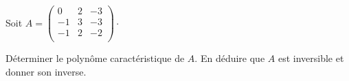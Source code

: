 \documentclass[a4paper,10pt]{report}
\begin{document}
\begin{exa} Soit $A = \begin{pmatrix}
0& 2 & -3 \\
-1 & 3 & -3 \\
-1 & 2 & -2 \\
\end{pmatrix} \cdot$

\noindent Déterminer le polynôme caractéristique de $A$. En déduire que $A$ est inversible et donner son inverse.
\end{exa}
\end{document}
